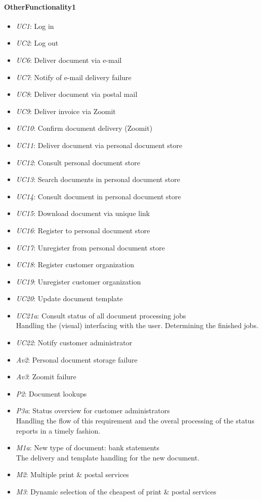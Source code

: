 \documentclass[a4paper,10pt]{article}
\begin{document}
\paragraph{OtherFunctionality1}
\begin{itemize}
    \item \emph{UC1}: Log in
    \item \emph{UC2}: Log out
    \item \emph{UC6}: Deliver document via e-mail
    \item \emph{UC7}: Notify of e-mail delivery failure
    \item \emph{UC8}: Deliver document via postal mail
    \item \emph{UC9}: Deliver invoice via Zoomit
    \item \emph{UC10}: Confirm document delivery (Zoomit)
    \item \emph{UC11}: Deliver document via personal document store
    \item \emph{UC12}: Consult personal document store
    \item \emph{UC13}: Search documents in personal document store
    \item \emph{UC14}: Consult document in personal document store
    \item \emph{UC15}: Download document via unique link
    \item \emph{UC16}: Register to personal document store
    \item \emph{UC17}: Unregister from personal document store
    \item \emph{UC18}: Register customer organization
    \item \emph{UC19}: Unregister customer organization
    \item \emph{UC20}: Update document template
    \item \emph{UC21a}: Consult status of all document processing jobs\\
    Handling the (visual) interfacing with the user. Determining the finished jobs.
    \item \emph{UC22}: Notify customer administrator
    \item \emph{Av2}: Personal document storage failure 
    \item \emph{Av3}: Zoomit failure
    \item \emph{P2}: Document lookups
    \item \emph{P3a}: Status overview for customer administrators\\
    Handling the flow of this requirement and the overal processing of the status reports in a timely fashion.
    \item \emph{M1a}: New type of document: bank statements\\
    The delivery and template handling for the new document.
    \item \emph{M2}: Multiple print \& postal services
    \item \emph{M3}: Dynamic selection of the cheapest of print \& postal services
\end{itemize}
\end{document}
